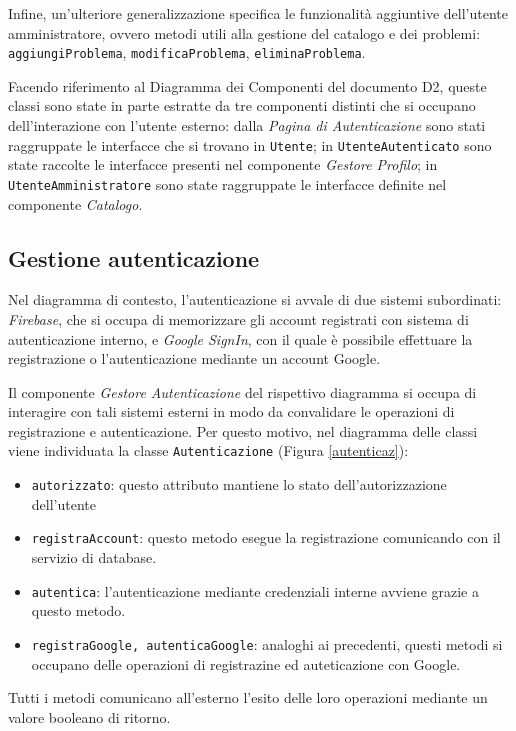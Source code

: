 \documentclass[11pt, a4paper]{article}
\theoremstyle{definition} %
\begin{document}
Infine, un'ulteriore generalizzazione specifica le funzionalità aggiuntive
dell'utente amministratore, ovvero metodi utili alla gestione del catalogo
e dei problemi:
\texttt{aggiungiProblema}, \texttt{modificaProblema}, \texttt{eliminaProblema}.


Facendo riferimento al Diagramma dei Componenti del
documento D2, queste classi sono state in parte estratte da tre componenti
distinti che si occupano dell'interazione con l'utente esterno: dalla
\textit{Pagina di Autenticazione} sono stati raggruppate le interfacce che
si trovano in \texttt{Utente}; in \texttt{UtenteAutenticato} sono state
raccolte le interfacce presenti nel componente \textit{Gestore Profilo};
in \texttt{UtenteAmministratore} sono state raggruppate le interfacce
definite nel componente \textit{Catalogo}.


\newpage
\subsection{Gestione autenticazione}
Nel diagramma di contesto, l'autenticazione si avvale di due sistemi
subordinati: \textit{Firebase}, che si occupa di memorizzare gli account
registrati con sistema di autenticazione interno, e \textit{Google SignIn},
con il quale è possibile effettuare la registrazione o l'autenticazione
mediante un account Google.

Il componente \textit{Gestore Autenticazione} del rispettivo diagramma si
occupa di interagire con tali sistemi esterni in modo da convalidare le
operazioni di registrazione e autenticazione. Per questo motivo, nel diagramma
delle classi viene individuata la classe \texttt{Autenticazione} (Figura \ref{autenticaz}):
\begin{itemize}
    \item \texttt{autorizzato}: questo attributo mantiene lo stato dell'autorizzazione
    dell'utente

    \item \texttt{registraAccount}: questo metodo esegue la registrazione
    comunicando con il servizio di database.
    \item \texttt{autentica}: l'autenticazione mediante credenziali interne
    avviene grazie a questo metodo.
    \item \texttt{registraGoogle, autenticaGoogle}: analoghi ai precedenti,
    questi metodi si occupano delle operazioni di registrazine ed auteticazione
    con Google.
\end{itemize}
Tutti i metodi comunicano all'esterno l'esito delle loro operazioni mediante
un valore booleano di ritorno.
\end{document}
